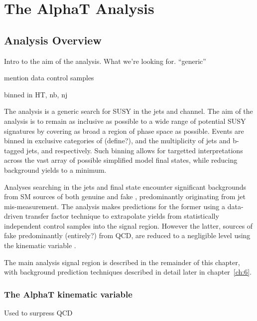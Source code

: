 \chapter{The AlphaT Analysis}
\label{ch:5}

\ifpdf
    \graphicspath{{Chapter5/Figs/Raster/}{Chapter5/Figs/PDF/}{Chapter5/Figs/}}
\else
    \graphicspath{{Chapter5/Figs/Vector/}{Chapter5/Figs/}}
\fi


\section{Analysis Overview}  %
\label{sec:selection_analysis_overview}

Intro to the aim of the analysis. What we're looking for. ``generic''

mention data control samples

binned in HT, nb, nj


The \alphat analysis is a generic search for SUSY in the jets and 
\met channel. The aim of the analysis is to remain as inclusive as possible to a
wide range of potential SUSY signatures by covering as broad a region of phase 
space as possible. Events are binned in exclusive categories of \HT (define?), 
and the multiplicity of jets and b-tagged jets,  
\nj and \nb respectively. Such binning allows for targetted interpretations across
the vast array of
possible simplified model final states, while reducing background yields to a 
minimum.

Analyses searching in the jets and \met final state encounter significant 
backgrounds from SM sources of both genuine  
and fake \met, predominantly originating from jet mis-measurement. The \alphat 
analysis makes predictions for the former using a data-driven transfer factor 
technique to extrapolate yields from statistically independent control samples 
into the signal region. However the latter, sources of fake \met predominantly 
(entirely?) from QCD, are reduced to a negligible level using the kinematic 
variable \alphat.

The main analysis signal region is described in the remainder of this chapter,
with background prediction techniques described in detail later in
chapter~\ref{ch:6}.


\subsection{The AlphaT kinematic variable}
Used to surpress QCD

